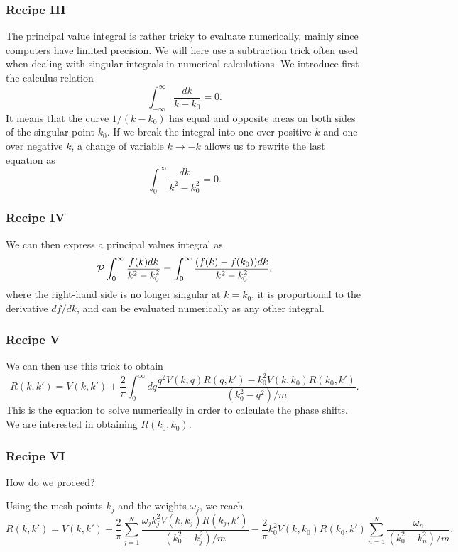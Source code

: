 \documentclass[compress]{beamer}
\begin{document}
\frame
{
\frametitle{Recipe III}
\begin{small}
{\scriptsize

The principal value integral is rather tricky
to evaluate numerically, mainly since computers have limited
precision. We will here use a subtraction trick often used
when dealing with singular integrals in numerical calculations.
We introduce first the calculus relation
\[
  \int_{-\infty}^{\infty} \frac{dk}{k-k_0} =0.
\]
It means that the curve $1/(k-k_0)$ has equal and opposite
areas on both sides of the singular point $k_0$. If we break
the integral into one over positive $k$ and one over 
negative $k$, a change of variable $k\rightarrow -k$ 
allows us to rewrite the last equation as
\[
  \int_{0}^{\infty} \frac{dk}{k^2-k_0^2} =0.
\]
}
\end{small}

}


\frame
{
\frametitle{Recipe IV}
\begin{small}
{\scriptsize

We can then express a principal values integral
as
\[
  {\cal P}\int_{0}^{\infty} \frac{f(k)dk}{k^2-k_0^2} =
  \int_{0}^{\infty} \frac{(f(k)-f(k_0))dk}{k^2-k_0^2},
   \label{eq:trick}
\]
where the right-hand side is no longer singular at 
$k=k_0$, it is proportional to the derivative $df/dk$,
and can be evaluated numerically as any other integral.
}
\end{small}

}


\frame
{
\frametitle{Recipe V}
\begin{small}
{\scriptsize

We can then use this trick to obtain
\[
    R(k,k') = V(k,k') +\frac{2}{\pi}
                \int_0^{\infty}dq
                \frac{q^2V(k,q)R(q,k')-k_0^2V(k,k_0)R(k_0,k')  }
                     {(k_0^2-q^2)/m}.
   \label{eq:ls2}
\]
This is the equation to solve numerically in order
to calculate the phase shifts. We are interested in obtaining
$R(k_0,k_0)$.
}
\end{small}

}


\frame
{
\frametitle{Recipe VI}
\begin{small}
{\scriptsize

How do we proceed?

Using the mesh points $k_j$ and the weights $\omega_j$,
         we reach
\[
          R(k,k') = V(k,k') +\frac{2}{\pi}
          \sum_{j=1}^N\frac{\omega_jk_j^2V(k,k_j)R(k_j,k')}
                           {(k_0^2-k_j^2)/m}
           -\frac{2}{\pi}k_0^2V(k,k_0)R(k_0,k')
          \sum_{n=1}^N\frac{\omega_n}
                           {(k_0^2-k_n^2)/m}.                
\]
}
\end{small}

}
\end{document}
